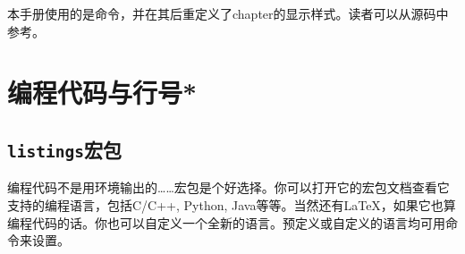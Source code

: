 本手册使用的是命令，并在其后重定义了chapter的显示样式。读者可以从源码中参考。

\section{编程代码与行号*}
\label{sec:coding}
\subsection{\texttt{listings}宏包}
编程代码不是用环境输出的……宏包是个好选择。你可以打开它的宏包文档查看它支持的编程语言，包括C/C++, Python, Java等等。当然还有\LaTeX，如果它也算编程代码的话。你也可以自定义一个全新的语言。预定义或自定义的语言均可用命令来设置。
\begin{latex}
\end{latex}

